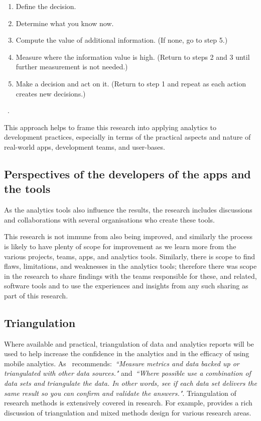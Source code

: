 \begin{enumerate}
    \item Define the decision.
    \item Determine what you know now.
    \item Compute the value of additional information. (If none, go to step 5.)
    \item Measure where the information value is high. (Return to steps 2 and 3 until further measurement is not needed.)
    \item Make a decision and act on it. (Return to step 1 and repeat as each action creates new decisions.)
\end{enumerate} ~\cite[p.9]{hubbard2014measure}.

This approach helps to frame this research into applying analytics to development practices, especially in terms of the practical aspects and nature of real-world apps, development teams, and user-bases.


\subsection{Perspectives of the developers of the apps and the tools}
As the analytics tools also influence the results, the research includes discussions and collaborations with several organisations who create these tools.

This research is not immune from also being improved, and similarly the process is likely to have plenty of scope for improvement as we learn more from the various projects, teams, apps, and analytics tools. Similarly, there is scope to find flaws, limitations, and weaknesses in the analytics tools; therefore there was scope in the research to share findings with the teams responsible for these, and related, software tools and to use the experiences and insights from any such sharing as part of this research.


\subsection{Triangulation}
Where available and practical, triangulation %
of data and analytics reports will be used to help increase the confidence in the analytics and in the efficacy of using mobile analytics. As~ recommends:~\emph{``Measure metrics and data backed up or triangulated with other data sources."} and~\emph{``Where possible use a combination of data sets and triangulate the data. In other words, see if each data set delivers the same result so you can confirm and validate the answers."}. Triangulation of research methods is extensively covered in research. For example,  provides a rich discussion of triangulation and mixed methods design for various research areas. %

